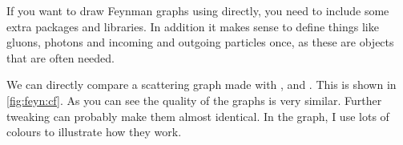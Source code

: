 If you want to draw Feynman graphs using \TikZ directly,
you need to include some extra \TikZ packages and libraries.
In addition it makes sense to
define things like gluons, photons and incoming and outgoing particles
once, as these are objects that are often needed.


We can directly compare a scattering graph made with
, \Package{\TikZ} and .
This is shown in \cref{fig:feyn:cf}.
As you can see the quality of the graphs is very similar.
Further tweaking can probably make them almost identical.
In the  graph, I use lots of colours to illustrate how they work.

